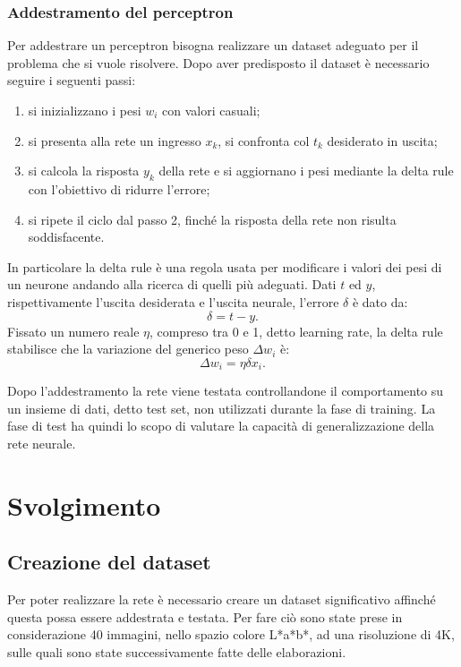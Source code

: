 \documentclass[a4paper,11pt]{article}
\begin{document}
    \newpage
    \subsubsection{Addestramento del perceptron}
    Per addestrare un perceptron bisogna realizzare un dataset adeguato per il problema che si vuole risolvere. 
    Dopo aver predisposto il dataset è necessario seguire i seguenti passi:
    \begin{enumerate}
        \item si inizializzano i pesi $w_i$ con valori casuali;
        \item si presenta alla rete un ingresso $x_k$, si confronta col $t_k$ desiderato in uscita;
        \item si calcola la risposta $y_k$ della rete e si aggiornano i pesi mediante la delta rule con l'obiettivo di ridurre l'errore;
        \item si ripete il ciclo dal passo 2, finché la risposta della rete non risulta soddisfacente.
    \end{enumerate}

    In particolare la delta rule è una regola usata per modificare i valori dei pesi di un neurone andando alla ricerca di quelli più adeguati.
    Dati $t$ ed $y$, rispettivamente l'uscita desiderata e l'uscita neurale, l'errore $\delta$ è dato da:
    $$ \delta = t-y.$$
    Fissato un numero reale $\eta$, compreso tra 0 e 1, detto learning rate, la delta rule stabilisce che la variazione del generico peso $\Delta w_i$ è:
    $$ \Delta w_i = \eta \delta x_i.$$

    Dopo l’addestramento la rete viene testata controllandone il comportamento su un insieme di dati, detto test set, non utilizzati durante la fase di training. La fase di test ha quindi lo scopo 
    di valutare la capacità di generalizzazione della rete neurale.

  
    \newpage
    \section{Svolgimento}

    \subsection{Creazione del dataset}
    Per poter realizzare la rete è necessario creare un dataset significativo affinché questa possa essere addestrata e testata. 
    Per fare ciò sono state prese in considerazione 40 immagini, nello spazio colore L*a*b*, ad una risoluzione di 4K, sulle quali sono state successivamente fatte delle elaborazioni.
\end{document}
